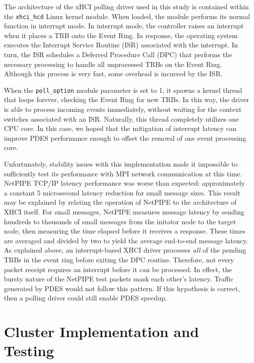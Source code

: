 \documentclass[11pt]{book}
\begin{document}
The architecture of the xHCI polling driver used in this study is contained within the
\verb;xhci_hcd; Linux kernel module.  When loaded, the module performs its normal function
in interrupt mode.  In interrupt mode, the controller raises an interrupt when it places a
TRB onto the Event Ring.  In response, the operating system executes the Interrupt Service
Routine (ISR) associated with the interrupt.  In turn, the ISR schedules a Deferred
Procedure Call (DPC) that performs the necessary processing to handle all unprocessed TRBs
on the Event Ring.  Although this process is very fast, some overhead is incurred by the
ISR.

When the \verb;poll_option; module parameter is set to 1, it spawns a kernel thread that
loops forever, checking the Event Ring for new TRBs.  In this way, the driver is able to
process incoming events immediately, without waiting for the context switches associated
with an ISR.  Naturally, this thread completely utilizes one CPU core.  In this case, we
hoped that the mitigation of interrupt latency can improve PDES performance enough to
offset the removal of one event processing core.

Unfortunately, stability issues with this implementation made it impossible to
sufficiently test its performance with MPI network communication at this time.  NetPIPE
TCP/IP latency performance was worse than expected: approximately a constant 5 microsecond
latency reduction for small message sizes. This result may be explained by relating the
operation of NetPIPE to the architecture of XHCI itself.  For small messages, NetPIPE
measures message latency by sending hundreds to thousands of small messages from the
initator node to the target node, then measuring the time elapsed before it receives a
response. These times are averaged and divided by two to yield the average end-to-end
message latency. As explained above, an interrupt-based XHCI driver processes \emph{all}
of the pending TRBs in the event ring before exiting the DPC routine. Therefore, not every
packet receipt requires an interrupt before it can be processed. In effect, the bursty
nature of the NetPIPE test packets mask each other's latency. Traffic generated by PDES
would not follow this pattern. If this hypothesis is correct, then a polling driver could
still enable PDES speedup.

\chapter{Cluster Implementation and Testing}\label{cluster}
\end{document}
